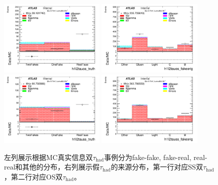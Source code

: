\begin{figure}[htbp]
\centering
\begin{center}
  \includegraphics[width=0.45\textwidth, keepaspectratio]{fig/OneLepTwoTaus/Plots_h1l2tauos_truth_signal.pdf}
  \includegraphics[width=0.45\textwidth, keepaspectratio]{fig/OneLepTwoTaus/Plots_h1l2tauos_fakeorig_signal.pdf}
  \includegraphics[width=0.45\textwidth, keepaspectratio]{fig/OneLepTwoTaus/Plots_h1l2tauss_truth_signal.pdf}
  \includegraphics[width=0.45\textwidth, keepaspectratio]{fig/OneLepTwoTaus/Plots_h1l2tauss_fakeorig_signal.pdf}
\end{center}
\caption{左列展示根据MC真实信息双$\tau_{\text{had}}$事例分为fake-fake, fake-real, real-real和其他的分布，右列展示假$\tau_{\text{had}}$的来源分布，第一行对应SS双$\tau_{\text{had}}$，第二行对应OS双$\tau_{\text{had}}$。}
\label{Fig:1l2tau.truth}
\end{figure}

